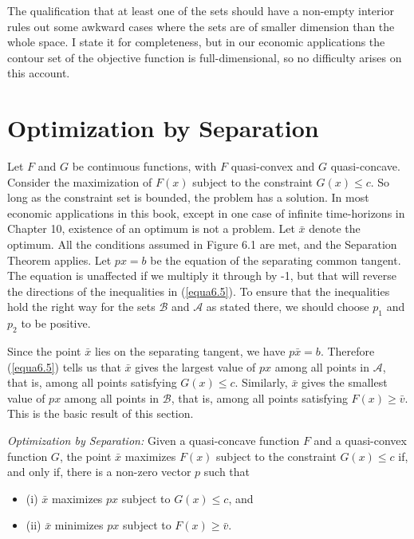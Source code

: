The qualification that at least one of the sets should have a non-empty interior rules out some awkward cases where the sets are of smaller dimension than the whole space. I state it for completeness, but in our economic applications the contour set of the objective function is full-dimensional, so no difficulty arises on this account.

\section*{Optimization by Separation}

Let $F$ and $G$ be continuous functions, with $F$ quasi-convex and $G$ quasi-concave. Consider the maximization of $F(x)$ subject to the constraint $G(x) \leq c$. So long as the constraint set is bounded, the problem has a solution. In most economic applications in this book, except in one case of infinite time-horizons in Chapter 10, existence of an optimum is not a problem. Let $\bar{x}$ denote the optimum. All the conditions assumed in Figure 6.1 are met, and the Separation Theorem applies. Let $px=b$ be the equation of the separating common tangent. The equation is unaffected if we multiply it through by -1, but that will reverse the directions of the inequalities in (\ref{equa6.5}). To ensure that the inequalities hold the right way for the sets $\mathcal{B}$ and $\mathcal{A}$ as stated there, we should choose $p_1$ and $p_2$ to be positive.

Since the point $\bar{x}$ lies on the separating tangent, we have $p \bar{x} =b$. Therefore (\ref{equa6.5}) tells us that $\bar{x}$ gives the largest value of $px$ among all points in $\mathcal{A}$, that is, among all points satisfying $G(x) \leq c$. Similarly, $\bar{x}$ gives the smallest value of $px$ among all points in $\mathcal{B}$, that is, among all points satisfying $F(x) \geq \bar{v}$. This is the basic result of this section.

\textit{Optimization by Separation:} Given a quasi-concave function $F$ and a quasi-convex function $G$, the point $\bar{x}$ maximizes $F(x)$ subject to the constraint $G(x) \leq c$ if, and only if, there is a non-zero vector $p$ such that
\begin{itemize}
\item (i) $\bar{x}$ maximizes $px$ subject to $G(x) \leq c$, and
\item (ii) $\bar{x}$ minimizes $px$ subject to $F(x) \geq \bar{v}$.
\end{itemize}

